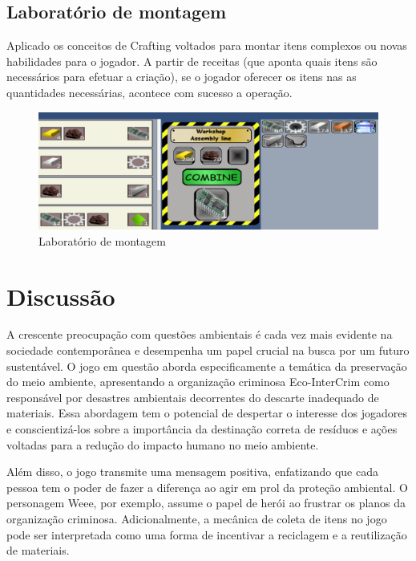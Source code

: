 \subsection{Laboratório de montagem}
Aplicado os conceitos de Crafting voltados para montar itens complexos ou novas habilidades para o jogador. A partir de receitas (que aponta quais itens são necessários para efetuar a criação), se o jogador oferecer os itens nas as quantidades necessárias, acontece com sucesso a operação.
\begin{figure}[h]
    \centering
    \includegraphics[width=500px]{figuras/assembly.png}
    \caption{Laboratório de montagem}
    \label{fig_assembler}
\end{figure}

\section{Discussão}
A crescente preocupação com questões ambientais é cada vez mais evidente na sociedade contemporânea e desempenha um papel crucial na busca por um futuro sustentável. O jogo em questão aborda especificamente a temática da preservação do meio ambiente, apresentando a organização criminosa Eco-InterCrim como responsável por desastres ambientais decorrentes do descarte inadequado de materiais. Essa abordagem tem o potencial de despertar o interesse dos jogadores e conscientizá-los sobre a importância da destinação correta de resíduos e ações voltadas para a redução do impacto humano no meio ambiente.

Além disso, o jogo transmite uma mensagem positiva, enfatizando que cada pessoa tem o poder de fazer a diferença ao agir em prol da proteção ambiental. O personagem Weee, por exemplo, assume o papel de herói ao frustrar os planos da organização criminosa. Adicionalmente, a mecânica de coleta de itens no jogo pode ser interpretada como uma forma de incentivar a reciclagem e a reutilização de materiais.

